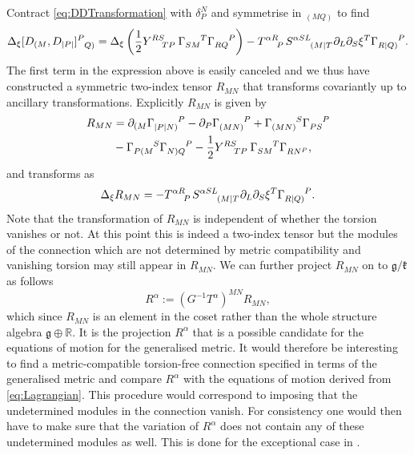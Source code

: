 Contract \eqref{eq:DDTransformation} with $\delta^N_P$ and symmetrise in $_{(MQ)}$ to find 
\begin{equation}
    \Delta_\xi [D_{(M},D_{|P|}]\tensor{}{^P_{Q)}} = \Delta_\xi \left(\frac{1}{2}\tensor{Y}{^{RS}_{TP}}\tensor{\Gamma}{_{SM}^T}\tensor{\Gamma}{_{RQ}^P}\right)-\tensor{T}{^{\alpha R}_P}\tensor{S}{^{\alpha SL}_{(M|T}}\pd_L\pd_S\xi^T\tensor{\Gamma}{_{R|Q)}^P}.
\end{equation}
The first term in the expression above is easily canceled and we thus have constructed a symmetric two-index tensor $R_{MN}$ that transforms covariantly up to ancillary transformations. Explicitly $R_{MN}$ is given by 
\begin{equation}
    \begin{aligned}
        R_{MN} &= \pd_{(M}\tensor{\Gamma}{_{|P|N)}^P}-\pd_P\tensor{\Gamma}{_{(MN)}^P}+\tensor{\Gamma}{_{(MN)}^S}\tensor{\Gamma}{_{PS}^P}\\
        &-\tensor{\Gamma}{_{P(M}^S}\tensor{\Gamma}{_{N)Q}^P}-\frac{1}{2}\tensor{Y}{^{RS}_{TP}}\tensor{\Gamma}{_{SM}^T}\tensor{\Gamma}{_{RN^P}},
    \end{aligned}
\end{equation}
and transforms as 
\begin{equation}
    \Delta_\xi R_{MN} = -\tensor{T}{^{\alpha R}_P}\tensor{S}{^{\alpha SL}_{(M|T}}\pd_L\pd_S\xi^T\tensor{\Gamma}{_{R|Q)}^P}.
\end{equation}
Note that the transformation of $R_{MN}$ is independent of whether the torsion vanishes or not. At this point this is indeed a two-index tensor but the modules of the connection which are not determined by metric compatibility and vanishing torsion may still appear in $R_{MN}$. We can further project $R_{MN}$ on to $\mathfrak{g}/\mathfrak{k}$ as follows 
\begin{equation}
    R^\alpha := (G^{-1}T^\alpha)^{MN}R_{MN},
\end{equation}
which since $R_{MN}$ is an element in the coset rather than the whole structure algebra $\mathfrak{g}\oplus\mathbb{R}$. It is the projection $R^\alpha$ that is a possible candidate for the equations of motion for the generalised metric. It would therefore be interesting to find a metric-compatible torsion-free connection specified in terms of the generalised metric and compare $R^\alpha$ with the equations of motion derived from \eqref{eq:Lagrangian}. This procedure would correspond to imposing that the undetermined modules in the connection vanish. For consistency one would then have to make sure that the variation of $R^\alpha$ does not contain any of these undetermined modules as well. This is done for the exceptional case in \cite{Cederwall:2013naa}.

